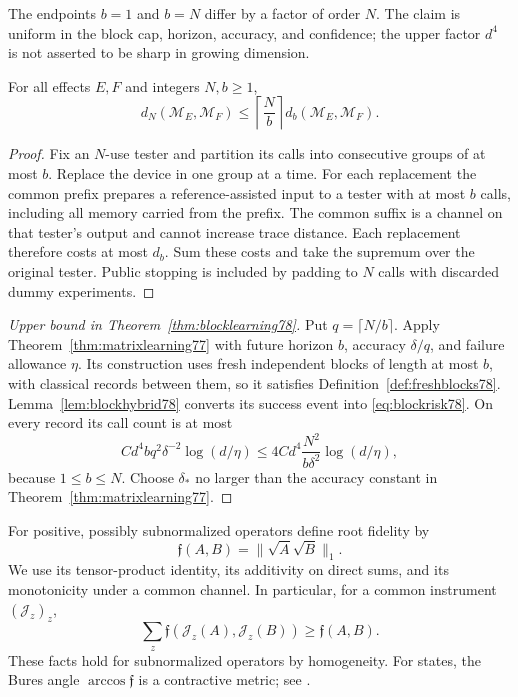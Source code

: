 The endpoints $b=1$ and $b=N$ differ by a factor of order $N$.
The claim is uniform in the block cap, horizon, accuracy, and confidence;
the upper factor $d^4$ is not asserted to be sharp in growing dimension.

\begin{lemma}
\label{lem:blockhybrid78}
For all effects $E,F$ and integers $N,b\ge1$,
\begin{equation}\label{eq:blockhybrid78}
 d_N(\mathcal M_E,\mathcal M_F)
 \le\left\lceil\frac Nb\right\rceil
           d_b(\mathcal M_E,\mathcal M_F).
\end{equation}
\end{lemma}
\begin{proof}
Fix an $N$-use tester and partition its calls into consecutive groups
of at most $b$.  Replace the device in one group at a time.  For each
replacement the common prefix prepares a reference-assisted input
to a tester with at most $b$ calls, including all memory carried from
the prefix.  The common suffix is a channel on that tester's output
and cannot increase trace distance.  Each replacement therefore
costs at most $d_b$.  Sum these costs and take the supremum over the
original tester.  Public stopping is included by padding to $N$ calls
with discarded dummy experiments.
\end{proof}

\begin{proof}[Upper bound in Theorem~\ref{thm:blocklearning78}]
Put $q=\lceil N/b\rceil$.  Apply
Theorem~\ref{thm:matrixlearning77} with future horizon $b$, accuracy
$\delta/q$, and failure allowance $\eta$.  Its construction uses fresh
independent blocks of length at most $b$, with classical records between
them, so it satisfies Definition~\ref{def:freshblocks78}.
Lemma~\ref{lem:blockhybrid78} converts its success event into
\eqref{eq:blockrisk78}.  On every record its call count is at most
\[
 C d^4 bq^2\delta^{-2}\log(d/\eta)
 \le 4C d^4\frac{N^2}{b\delta^2}\log(d/\eta),
\]
because $1\le b\le N$.  Choose $\delta_*$ no larger than the
accuracy constant in Theorem~\ref{thm:matrixlearning77}.
\end{proof}

For positive, possibly subnormalized operators define root fidelity by
\[
 \mathfrak f(A,B)=\|\sqrt A\sqrt B\|_1.
\]
We use its tensor-product identity, its additivity on direct sums, and
its monotonicity under a common channel.  In particular, for a common
instrument $(\mathcal J_z)_z$,
\begin{equation}\label{eq:blockinstrument78}
 \sum_z\mathfrak f(\mathcal J_z(A),\mathcal J_z(B))
 \ge\mathfrak f(A,B).
\end{equation}
These facts hold for subnormalized operators by homogeneity.  For
states, the Bures angle $\arccos\mathfrak f$ is a contractive metric;
see \cite{Watrous65,YF76}.

